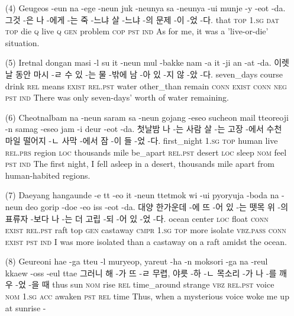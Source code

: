 \begin{itemize}
\item [(4)]
\tgl
		{Geugeos -eun na -ege -neun juk -neunya sa -neunya -ui munje -y -eot -da.}
		{그것 -은 나 -에게 -는 죽 -느냐 살 -느냐 -의 문제 -이 -었 -다.}
		{that	\textsc{top}	\textsc{1.sg}	\textsc{dat}	\textsc{top}	die	\textsc{q}	live	\textsc{q}	\textsc{gen}	problem	\textsc{cop}	\textsc{pst}	\textsc{ind}}
		{As for me, it was a 'live-or-die' situation.}
		
\item [(5)]
\tgl
		{Iretnal dongan masi -l su it -neun mul -bakke nam -a it -ji an -at -da.}
		{이렛날 동안 마시 -ㄹ 수 있 -는 물 -밖에 남 -아 있 -지 않 -았 -다.}
		{seven\_days	course	drink	\textsc{rel}	means	\textsc{exist}	\textsc{rel.pst}	water	other\_than	remain	\textsc{conn}	\textsc{exist}	\textsc{conn}	\textsc{neg}	\textsc{pst}	\textsc{ind}}
		{There was only seven-days' worth of water remaining.}
		
\item [(6)]
\tgl
		{Cheotnalbam na -neun saram sa -neun gojang -eseo sucheon mail tteoreoji -n samag -eseo jam -i deur -eot -da.}
		{첫날밤 나 -는 사람 살 -는 고장 -에서 수천 마일 떨어지 -ㄴ 사막 -에서 잠 -이 들 -었 -다.}
		{first\_night	\textsc{1.sg}	\textsc{top}	human	live	\textsc{rel.prs}	region	\textsc{loc}	thousands	mile	be\_apart	\textsc{rel.pst}	desert	\textsc{loc}	sleep	\textsc{nom}	feel	\textsc{pst}	\textsc{ind}}
		{The first night, I fell asleep in a desert, thousands mile apart from human-habited regions.}

\item [(7)]
\tgl
		{Daeyang hangaunde -e tt -eo it -neun ttetmok wi -ui pyoryuja -boda na -neun deo gorip -doe -eo iss -eot -da.}
		{대양 한가운데 -에 뜨 -어 있 -는 뗏목 위 -의 표류자 -보다 나 -는 더 고립 -되 -어 있 -었 -다.}
		{ocean	center	\textsc{loc}	float	\textsc{conn}	\textsc{exist}	\textsc{rel.pst}	raft	top	\textsc{gen}	castaway	\textsc{cmpr}	\textsc{1.sg}	\textsc{top}	more	isolate	\textsc{vbz.pass}	\textsc{conn}	\textsc{exist}	\textsc{pst}	\textsc{ind}}
		{I was more isolated than a castaway on a raft amidst the ocean.}

\item [(8)]
\tgl
		{Geureoni hae -ga tteu -l muryeop, yareut -ha -n moksori -ga na -reul kkaew -oss -eul ttae}
		{그러니 해 -가 뜨 -ㄹ 무렵, 야릇 -하 -ㄴ 목소리 -가 나 -를 깨우 -었 -을 때}
		{thus	sun	\textsc{nom}	rise	\textsc{rel}	time\_around	strange	\textsc{vbz}	\textsc{rel.pst}	voice	\textsc{nom}	\textsc{1.sg}	\textsc{acc}	awaken	\textsc{pst}	\textsc{rel}	time}
		{Thus, when a mysterious voice woke me up at sunrise -}


\end{itemize}
